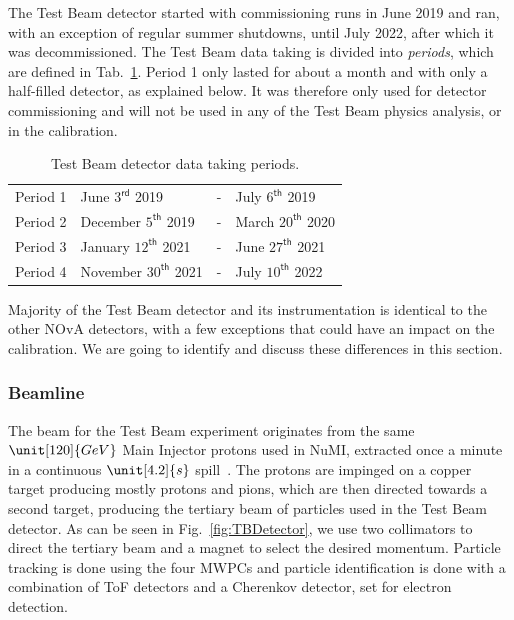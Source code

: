 
The Test Beam detector started with commissioning runs in June 2019 and ran, with an exception of regular summer shutdowns, until July 2022, after which it was decommissioned. The Test Beam data taking is divided into \textit{periods}, which are defined in Tab.~\ref{tab:TestBeamPeriods}. Period 1 only lasted for about a month and with only a half-filled detector, as explained below. It was therefore only used for detector commissioning and will not be used in any of the Test Beam physics analysis, or in the calibration.
\begin{table}[!ht]
\centering
\caption{Test Beam detector data taking periods.}
\def\arraystretch{1.4}
\begin{tabular}{l@{\hskip 1in}lcl}
Period 1 & June $3^{\textsf{rd}}$ 2019 & - & July $6^{\textsf{th}}$ 2019\\
Period 2 & December $5^{\textsf{th}}$ 2019 & - & March $20^{\textsf{th}}$ 2020\\
Period 3 & January $12^{\textsf{th}}$ 2021 & - & June $27^{\textsf{th}}$ 2021\\
Period 4 & November $30^{\textsf{th}}$ 2021 & - & July $10^{\textsf{th}}$ 2022
\end{tabular}
\label{tab:TestBeamPeriods}
\end{table}

Majority of the Test Beam detector and its instrumentation is identical to the other \gls{NOvA} detectors, with a few exceptions that could have an impact on the calibration. We are going to identify and discuss these differences in this section.


\subsubsection*{Beamline}
The beam for the Test Beam experiment originates from the same $\unit[120]{GeV}$ Main Injector protons used in \gls{NuMI}, extracted once a minute in a continuous $\unit[4.2]{s}$ spill~\cite{NOvATestBeamWallbangProceedings2020.pdf}. The protons are impinged on a copper target producing mostly protons and pions, which are then directed towards a second target, producing the tertiary beam of particles used in the Test Beam detector. As can be seen in Fig.~\ref{fig:TBDetector}, we use two collimators to direct the tertiary beam and a magnet to select the desired momentum. Particle tracking is done using the four \glspl{MWPC} and particle identification is done with a combination of \gls{ToF} detectors and a Cherenkov detector, set for electron detection.


